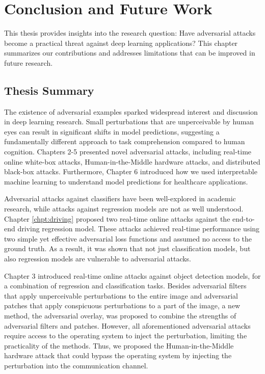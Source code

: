 \chapter{Conclusion and Future Work}
\label{chpt:conclusion}

This thesis provides insights into the research question: Have adversarial attacks become a practical threat against deep learning applications? This chapter summarizes our contributions and addresses limitations that can be improved in future research.

\section{Thesis Summary}

The existence of adversarial examples sparked widespread interest and discussion in deep learning research. Small perturbations that are unperceivable by human eyes can result in significant shifts in model predictions, suggesting a fundamentally different approach to task comprehension compared to human cognition. Chapters 2-5 presented novel adversarial attacks, including real-time online white-box attacks, Human-in-the-Middle hardware attacks, and distributed black-box attacks. Furthermore, Chapter 6 introduced how we used interpretable machine learning to understand model predictions for healthcare applications.

Adversarial attacks against classifiers have been well-explored in academic research, while attacks against regression models are not as well understood. Chapter \ref{chpt:driving} proposed two real-time online attacks against the end-to-end driving regression model. These attacks achieved real-time performance using two simple yet effective adversarial loss functions and assumed no access to the ground truth. As a result, it was shown that not just classification models, but also regression models are vulnerable to adversarial attacks.

Chapter 3 introduced real-time online attacks against object detection models, for a combination of regression and classification tasks. Besides adversarial filters that apply unperceivable perturbations to the entire image and adversarial patches that apply conspicuous perturbations to a part of the image, a new method, the adversarial overlay, was proposed to combine the strengths of adversarial filters and patches. However, all aforementioned adversarial attacks require access to the operating system to inject the perturbation, limiting the practicality of the methods. Thus, we proposed the Human-in-the-Middle hardware attack that could bypass the operating system by injecting the perturbation into the communication channel.

